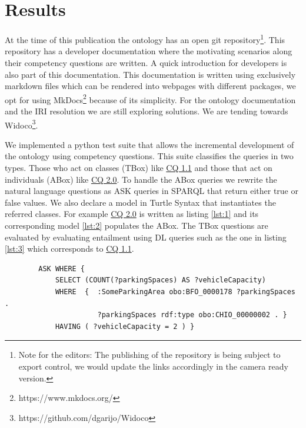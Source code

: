 \section{Results}
\label{results}

At the time of this publication the ontology has an open git
repository\footnote{Note for the editors: The publishing of the repository is
being subject to export control, we would update the links accordingly in the
camera ready version. }. This repository has a developer documentation where the
motivating scenarios along their competency questions are written. A quick
introduction for developers is also part of this documentation. This
documentation is written using exclusively markdown files which can be rendered
into webpages with different packages, we opt for using
MkDocs\footnote{https://www.mkdocs.org/} because of its simplicity. For the
ontology documentation and the IRI resolution we are still exploring solutions.
We are tending towards Widoco\footnote{https://github.com/dgarijo/Widoco}.

We implemented a python test suite that allows the incremental development of
the ontology using competency questions. This suite classifies the queries in
two types. Those who act on classes (TBox) like \hyperref[CQ1.1]{CQ 1.1} and
those that act on individuals (ABox) like \hyperref[CQ2.0]{CQ 2.0}. To handle
the ABox queries we rewrite the natural language questions as ASK queries in
SPARQL  that return either true or false values. We also declare a model in
Turtle Syntax that instantiates the referred classes. For example
\hyperref[CQ2.0]{CQ 2.0} is written as listing \ref{lst:1} and its corresponding
model \ref{lst:2} populates the ABox. The TBox questions are evaluated by
evaluating entailment using DL queries such as the one in listing \ref{lst:3}
which corresponds to \hyperref[CQ1.1]{CQ 1.1}.

\begin{listing}[h]
    
    \begin{verbatim}
        ASK WHERE {
            SELECT (COUNT(?parkingSpaces) AS ?vehicleCapacity)  
            WHERE  {  :SomeParkingArea obo:BFO_0000178 ?parkingSpaces . 
                      ?parkingSpaces rdf:type obo:CHIO_00000002 . }
            HAVING ( ?vehicleCapacity = 2 ) }
    \end{verbatim}
    \caption{Example ABox query. (Given a parking area with two parking places) What is the (vehicle) capacity of parking lot P? (2). The namespaces are omitted.}
    \label{lst:1}
\end{listing}

